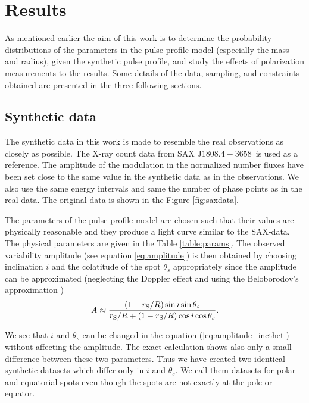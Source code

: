 \documentclass{wihuri}
\def\rg{r_{\rm S}} %
\def\be{\begin{equation}}
\def\ee{\end{equation}}
\def\rg{r_{\rm S}} %
\def\source{SAX J$1808.4-3658$}
\def\thetas{\theta_{s}}
\begin{document}


\clearpage

\section{Results}

As mentioned earlier the aim of this work is to determine the probability distributions of the parameters in the pulse profile model (especially the mass and radius), given the synthetic pulse profile, and study the effects of polarization measurements to the results. Some details of the data, sampling, and constraints obtained are presented in the three following sections. 


\subsection{Synthetic data}

The synthetic data in this work is made to resemble the real observations as closely as possible. The X-ray count data from \source \ is used as a reference. The amplitude of the modulation in the normalized number fluxes have been set close to the same value in the synthetic data as in the observations. We also use the same energy intervals and same the number of phase points as in the real data. The original data is shown in the Figure \ref{fig:saxdata}.  


The parameters of the pulse profile model are chosen such that their values are physically reasonable and they produce a light curve similar to the SAX-data. The physical parameters are given in the Table \ref{table:params}. The observed variability amplitude (see equation \ref{eq:amplitude}) is then obtained by choosing inclination $i$ and the colatitude of the spot $\thetas$ appropriately since the amplitude can be approximated (neglecting the Doppler effect and using the Beloborodov's approximation \cite{poutaviironen})
\be \label{eq:amplitude_incthet}
A \approx \frac{(1-\rg/R)\sin i \sin \thetas}{\rg/R+(1-\rg/R)\cos i \cos \thetas}.
\ee 

We see that $i$ and $\thetas$ can be changed in the equation (\ref{eq:amplitude_incthet}) without affecting the amplitude. The exact calculation shows also only a small difference between these two parameters. Thus we have created two identical synthetic datasets which differ only in $i$ and $\thetas$. We call them datasets for polar and equatorial spots even though the spots are not exactly at the pole or equator. 
\end{document}
